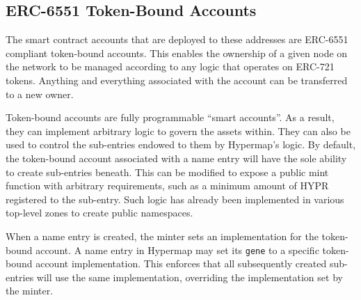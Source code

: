\documentclass[runningheads]{llncs}
\begin{document}
\subsection{ERC-6551 Token-Bound Accounts}

The smart contract accounts that are deployed to these addresses are ERC-6551 compliant token-bound accounts.
This enables the ownership of a given node on the network to be managed according to any logic that operates on ERC-721 tokens.
Anything and everything associated with the account can be transferred to a new owner.

Token-bound accounts are fully programmable ``smart accounts''.
As a result, they can implement arbitrary logic to govern the assets within.
They can also be used to control the sub-entries endowed to them by Hypermap's logic.
By default, the token-bound account associated with a name entry will have the sole ability to create sub-entries beneath.
This can be modified to expose a public mint function with arbitrary requirements, such as a minimum amount of HYPR registered to the sub-entry.
Such logic has already been implemented in various top-level zones to create public namespaces.

When a name entry is created, the minter sets an implementation for the token-bound account.
A name entry in Hypermap may set its \verb|gene| to a specific token-bound account implementation.
This enforces that all subsequently created sub-entries will use the same implementation, overriding the implementation set by the minter.


\end{document}
